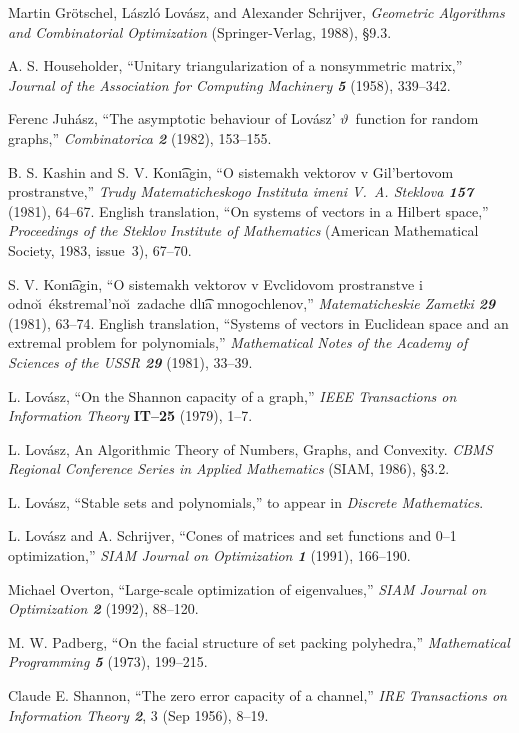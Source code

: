\bib
[\GLSbook]
Martin Gr\"otschel, L\'aszl\'o Lov\'asz, and Alexander Schrijver, 
{\sl Geometric Algorithms
and Combinatorial Optimization\/} (Springer-Verlag, 1988), \S9.3. 

\bib
[\House]
A. S. Householder, ``Unitary triangularization of a nonsymmetric matrix,''
{\sl Journal of the Association for Computing Machinery\/ \bf5} (1958),
339--342.

\bib
[\Ju]
Ferenc Juh\'asz, ``The asymptotic behaviour of Lov\'asz' $\vartheta$~function
for random graphs,'' {\sl Combinatorica\/ \bf 2} (1982), 153--155.

\bib
[\KK]
B. S. Kashin and S. V. Kon\t\i agin,
``O sistemakh vektorov v Gil'bertovom prostranstve,''
{\sl Trudy Matematicheskogo Instituta imeni V.~A. Steklova\/ \bf 157} (1981),
64--67. English translation, ``On systems of vectors in a Hilbert space,''
{\sl Proceedings of the Steklov Institute of Mathematics\/} (American
Mathematical Society, 1983, issue~3), 67--70.

\bib
[\Ko]
S. V. Kon\t\i agin, ``O sistemakh vektorov v Evclidovom prostranstve i 
odno\u\i\ \'ekstremal'\-no\u\i\ zadache dl\t\i a mnogochlenov,''
{\sl Matematicheskie Zametki\/ \bf 29} (1981), 63--74. English translation,
``Systems of vectors in Euclidean space and an extremal problem for
polynomials,'' {\sl Mathematical Notes of the Academy of Sciences of the USSR\/
\bf 29} (1981), 33--39.

\bib
[\Lov]
L. Lov\'asz, ``On the Shannon capacity of a graph,'' {\sl IEEE
Transactions on Information Theory\/} {\bf IT--25} (1979), 1--7.

\bib
[\LL] 
L. Lov\'asz, An Algorithmic Theory of Numbers, Graphs, and
Convexity. {\sl CBMS Regional Conference Series in Applied
Mathematics\/} (SIAM, 1986), \S3.2.

\bib
[\LLL]
L. Lov\'asz, ``Stable sets and polynomials,'' to appear in {\sl Discrete
Mathematics}. 

\bib
[\LS]
L. Lov\'asz and A. Schrijver, ``Cones of matrices and set functions and 0--1
optimization,'' {\sl SIAM Journal on Optimization\/ \bf 1} (1991), 166--190.

\bib
[\Ov] 
Michael Overton, ``Large-scale optimization of eigenvalues,'' 
{\sl SIAM Journal on Optimization\/ \bf 2} (1992), 88--120.

\bib
[\Padberg]
M. W. Padberg, ``On the facial structure of set packing polyhedra,''
{\sl Mathematical Programming\/ \bf 5} (1973), 199--215.

\bib
[\Shannon]
Claude E.  Shannon, ``The zero error capacity of a channel,''
 {\sl IRE Transactions on Information Theory\/
\bf 2}, 3 (Sep 1956), 8--19.

\bye
